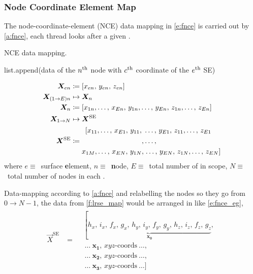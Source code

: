 	\subsubsection{Node Coordinate Element Map}
	The node-coordinate-element (NCE) data mapping in \cref{e:fnce} is carried out by \cref{a:fnce}, each thread looks after a given .
	\begin{algorithm}
		\caption{NCE data mapping.}
		\label{a:fnce}
		\begin{algorithmic}
			\State list.append(data of the $ n\textsuperscript{th}$ node with $ c\textsuperscript{th} $ coordinate of the $ e\textsuperscript{th} $ SE)
			\EndFor
			\EndFor
			\EndFor
		\end{algorithmic}
	\end{algorithm}
	\begin{subequations}\label{e:fnce}
		\begin{align}
			\vec{X}_{en}			&\coloneqq \left[x_{en},\, y_{en},\, z_{en}\right]\\
			\vec{X}_{(1\to E)n}		&\mapsto \vec{X}_{n} \nn
			\vec{X}_{n}				&\coloneqq \left[x_{1n},\ldots,\, x_{En},\, y_{1n},\ldots,\, y_{En},\, z_{1n},\ldots,\, z_{En}\right]\\
			\vec{X}_{1\to N}		&\mapsto \vec{X}^{\textrm{SE}}\nn
			\vec{X}^{\textrm{SE}}	&\coloneqq 
			\begin{aligned}
				\left[x_{11},\ldots,\, x_{E1},\, y_{11},\right.&\ldots,\, y_{E1},\, z_{11},\ldots,\, z_{E1}\\
				,&\ldots,\\
				x_{1M},\ldots,\, x_{EN},\, y_{1N},&\left.\ldots,\, y_{EN},\, z_{1N},\ldots,\, z_{EN}\right]
			\end{aligned}
		\end{align}
	\end{subequations}
	where $ e\equiv $~surface \textbf{e}lement, $ n \equiv $~\textbf{n}ode, $ E \equiv $~total number of  in scope, $ N \equiv $~total number of nodes in each .
	
	Data-mapping according to \cref{a:fnce} and relabelling the nodes so they go from $ 0 \to N-1 $, the data from \cref{f:lrse_map} would be arranged in  like \cref{e:fnce_eg},
	\begin{align}\label{e:fnce_eg}
		\vec{X}^{\textrm{SE}} &= \begin{aligned}
			&\left[\underbrace{h_{x},\, i_{x},\, f_{x},\, g_{x},\, 
				h_{y},\, i_{y},\, f_{y},\, g_{y},\, 
				h_{z},\, i_{z},\, f_{z},\, g_{z}}_{\mathbf{x_{0}}}\right.,\\
			&~\ldots~\mathbf{x_{1}},\, xyz\textrm{-coords}~\ldots,\\
			&~\ldots~\mathbf{x_{2}},\, xyz\textrm{-coords}~\ldots,\\
			&~\ldots~\mathbf{x_{3}},\, xyz\textrm{-coords}~\ldots]
		\end{aligned}
	\end{align}
